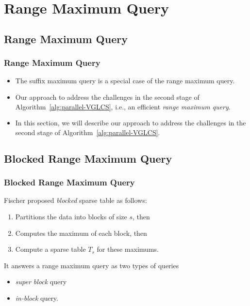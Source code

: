 \section{Range Maximum Query}

\subsection{Range Maximum Query}
\begin{frame}
    \frametitle{Range Maximum Query}
    \begin{itemize}
    	\setlength\itemsep{1em}
    	\item 
    		The suffix maximum query is a special case of the range
			maximum query.
		\item
			Our approach to address the challenges in the second stage
			of Algorithm~\ref{alg:parallel-VGLCS}, i.e., an efficient
			{\em range maximum query}.
		\item
			In this section, we will describe our approach to address
			the challenges in the second stage of
			Algorithm~\ref{alg:parallel-VGLCS}.
    \end{itemize}
\end{frame}

\subsection{Blocked Range Maximum Query}
\begin{frame}
    \frametitle{Blocked Range Maximum Query}
	Fischer proposed {\em blocked} sparse table as follows:
	\begin{enumerate}
		\setlength\itemsep{1em}
		\item
			Partitions the data into blocks of size $s$, then
		\item
			Computes the maximum of each block, then
		\item
			Compute a sparse table $T_s$ for these maximums.
	\end{enumerate}

	\vspace{1cm}
	It answers a range maximum query as two types of queries 
	\begin{itemize}
		\setlength\itemsep{1em}
		\item
			{\em super block} query
		\item
			{\em in-block} query.
	\end{itemize}
\end{frame}

